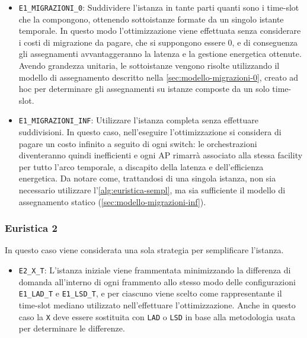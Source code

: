 \begin{itemize}
    \item \texttt{E1\_MIGRAZIONI\_0}: Suddividere l'istanza in tante parti quanti sono i time-slot che la compongono, ottenendo sottoistanze formate da un singolo istante temporale. In questo modo l'ottimizzazione viene effettuata senza considerare i costi di migrazione da pagare, che si suppongono essere 0, e di conseguenza gli assegnamenti avvantaggeranno la latenza e la gestione energetica ottenute. Avendo grandezza unitaria, le sottoistanze vengono risolte utilizzando il modello di assegnamento descritto nella \autoref{sec:modello-migrazioni-0}, creato ad hoc per determinare gli assegnamenti su istanze composte da un solo time-slot.

    \item \texttt{E1\_MIGRAZIONI\_INF}: Utilizzare l'istanza completa senza effettuare suddivisioni. In questo caso, nell'eseguire l'ottimizzazione si considera di pagare un costo infinito a seguito di ogni switch: le orchestrazioni diventeranno quindi inefficienti e ogni AP rimarrà associato alla stessa facility per tutto l'arco temporale, a discapito della latenza e dell'efficienza energetica. Da notare come, trattandosi di una singola istanza, non sia necessario utilizzare l'\autoref{alg:euristica-sempl}, ma sia sufficiente il modello di assegnamento statico (\autoref{sec:modello-migrazioni-inf}).
\end{itemize}

\subsubsection{Euristica 2}

In questo caso viene considerata una sola strategia per semplificare l'istanza.
\begin{itemize}
    \item \texttt{E2\_X\_T}: L'istanza iniziale viene frammentata minimizzando la differenza di domanda all'interno di ogni frammento allo stesso modo delle configurazioni \texttt{E1\_LAD\_T} e \texttt{E1\_LSD\_T}, e per ciascuno viene scelto come rappresentante il time-slot mediano utilizzato nell'effettuare l'ottimizzazione. Anche in questo caso la \texttt{X} deve essere sostituita con \texttt{LAD} o \texttt{LSD} in base alla metodologia usata per determinare le differenze.
\end{itemize}


\paragraph{}

